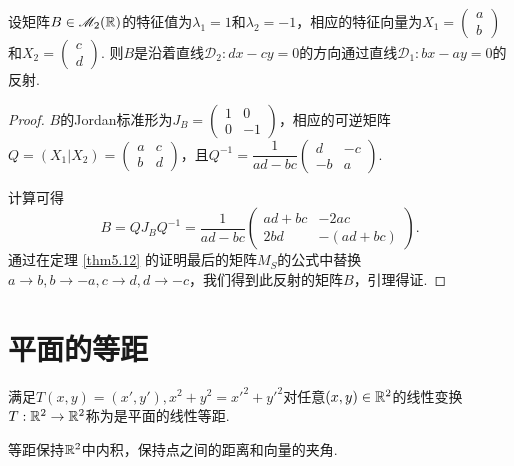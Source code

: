 \begin{mybox}
  \begin{lemma}[反射及其矩阵.]

    设矩阵$B\in\mathscr M_2(\mathbb R)$的特征值为$\lambda_1=1$和$\lambda_2=-1$，相应的特征向量为$X_1=\begin{pmatrix}
      a \\
      b
    \end{pmatrix}$和$X_2=\begin{pmatrix}
      c \\
      d
    \end{pmatrix}$. 则$B$是沿着直线$\mathscr D_2:dx-cy=0$的方向通过直线$\mathscr D_1:bx-ay=0$的反射.
  \end{lemma}
\end{mybox}
\begin{proof}
  $B$的Jordan标准形为$J_B=\begin{pmatrix}
    1 & 0 \\
    0 & -1
  \end{pmatrix}$，相应的可逆矩阵$Q=(X_1|X_2)=\begin{pmatrix}
    a & c \\
    b & d
  \end{pmatrix}$，且$Q^{-1}=\dfrac1{ad-bc}\begin{pmatrix}
    d & -c \\
    -b & a
  \end{pmatrix}$.

  计算可得
  \[
    B = QJ_BQ^{-1} = \frac1{ad-bc} \begin{pmatrix}
      ad + bc & -2ac \\
      2bd & -(ad + bc)
    \end{pmatrix}.
  \]
  通过在定理 \ref{thm5.12} 的证明最后的矩阵$M_S$的公式中替换$a\to b,b\to -a,c\to d,d\to -c$，我们得到此反射的矩阵$B$，引理得证.
\end{proof}

\section{平面的等距}
\begin{definition}
  满足$T(x,y)=(x',y'),x^2+y^2=x'^2+y'^2$对任意$(x,y)\in\mathbb R^2$的线性变换$T:\mathbb R^2\to\mathbb R^2$称为是平面的{\kaishu 线性等距}. 
\end{definition}

\begin{lemma}
  等距保持$\mathbb R^2$中内积，保持点之间的距离和向量的夹角.
\end{lemma}

